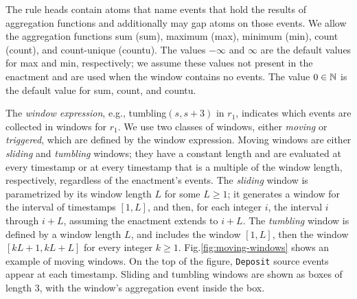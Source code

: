 The rule heads contain atoms
that name events that hold the results of aggregation functions
and additionally may gap atoms on those events.
We allow the aggregation functions
sum ({\sc sum}),
maximum ({\sc max}),
minimum ({\sc min}),
count ({\sc count}),
and
count-unique ({\sc countu}).
The values $-\infty$ and $\infty$
are the default values for {\sc max} and {\sc min}, respectively;
we assume these values not present in the enactment
and
are used when the window contains no events.
The value $0\in\mathbb{N}$ is the default value for {\sc sum},
{\sc count}, and {\sc countu}.

The {\em window expression},
e.g.,
{\sc tumbling}$(s,s+3)$ in $r_1$,
indicates which events are collected in windows for $r_1$.
We use two classes of windows,
either {\em moving} or {\em triggered},
which are defined by the window expression.
Moving windows are either
{\em sliding} and {\em tumbling} windows;
they have a constant length and
are evaluated at every timestamp
or at every timestamp that is a multiple of the window length, respectively,
regardless of the enactment's events.
The {\em sliding} window
is parametrized by its window length $L$ for some $L\geq 1$;
it generates a window for the interval of timestamps $[1,L]$,
and then, for each integer $i$, the interval $i$ through $i+L$,
assuming the enactment extends to $i+L$.
The {\em tumbling} window
is defined by a window length $L$, and
includes the window $[1,L]$,
then the window $[kL+1,kL+L]$ for every integer $k\geq 1$.
Fig.\:\ref{fig:moving-windows} shows an example of moving windows.
On the top of the figure,
{\tt Deposit} source events appear at each timestamp.
Sliding and tumbling windows are shown as boxes of length $3$,
with the window's aggregation event inside the box.

